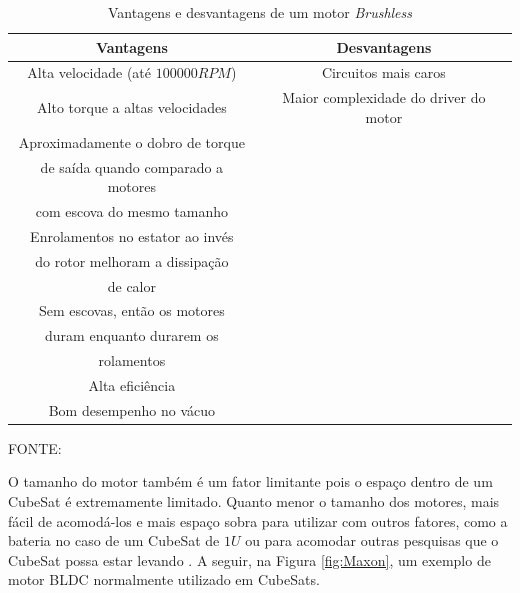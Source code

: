 \documentclass[
	12pt,				%
	openany,			%
	twoside,			%
	a4paper,			%
	english,			%
	french,				%
	spanish,			%
	brazil,				%
	oldfontcommands
	]{abntex2}
\begin{document}
\begin{table}[h]
	\caption{Vantagens e desvantagens de um motor \textit{Brushless}}
		\centering
	\begin{tabular}{|c|c|}
		\hline
		\textbf{Vantagens} & \textbf{Desvantagens} \\ 
		\hline 
		Alta velocidade (até $100000RPM$) & Circuitos mais caros \\ 
		\hline 
		Alto torque a altas velocidades & Maior complexidade do driver do motor \\ 
		\hline 
		Aproximadamente o dobro de torque & \\
		 de saída quando comparado a motores & \\
		  com escova do mesmo tamanho &  \\ 
		\hline 
		Enrolamentos no estator ao invés & \\
		 do rotor melhoram a dissipação & \\
		  de calor & \\ 
		\hline 
		Sem escovas, então os motores & \\
		 duram enquanto durarem os & \\
		  rolamentos & \\ 
		\hline 
		Alta eficiência & \\ 
		\hline 
		Bom desempenho no vácuo & \\ 
		\hline
	\end{tabular}
	
	\begin{small}
	\vspace{3pt}	
	FONTE: \cite{Ericksson}
	\end{small}
	\label{tab:VnteDesv}
\end{table}


O tamanho do motor também é um fator limitante pois o espaço dentro de um CubeSat é extremamente limitado. Quanto menor o tamanho dos motores, mais fácil de acomodá-los e mais espaço sobra para utilizar com outros fatores, como a bateria no caso de um CubeSat de $1U$ ou para acomodar outras pesquisas que o CubeSat possa estar levando \cite{Martins}. A seguir, na Figura \ref{fig:Maxon}, um exemplo de motor BLDC normalmente utilizado em CubeSats.
\end{document}
